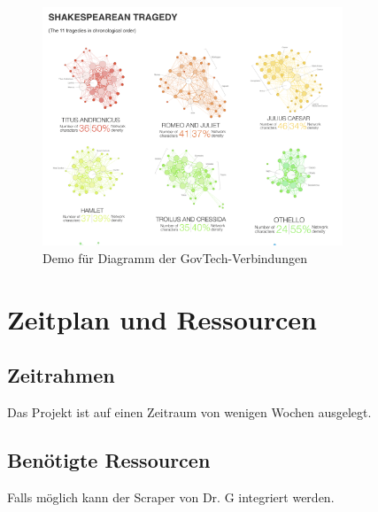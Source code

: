 \documentclass[a4paper,12pt]{article}
\begin{document}
\begin{figure}[h]
    \centering
    \includegraphics[width=0.8\textwidth]{net.png}
    \caption{Demo für Diagramm der GovTech-Verbindungen}
\end{figure}

\section{Zeitplan und Ressourcen}
\subsection*{Zeitrahmen}
Das Projekt ist auf einen Zeitraum von wenigen Wochen ausgelegt.

\subsection*{Benötigte Ressourcen}

Falls möglich kann der Scraper von Dr. G integriert werden.
\end{document}
